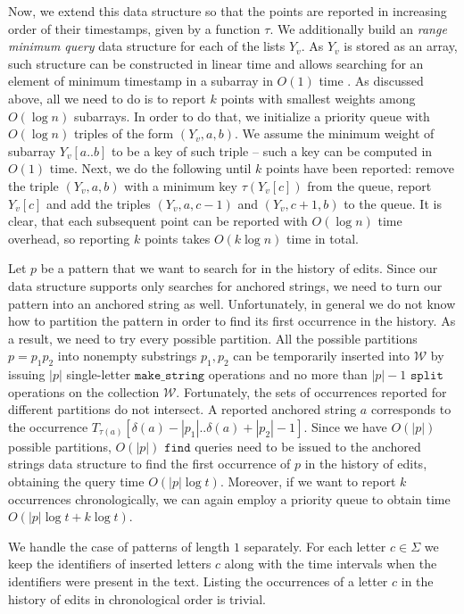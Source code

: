 \documentclass[a4paper]{article}
\theoremstyle{remark}
\newcommand{\makeop}{\mathtt{make\_string}}
\newcommand{\splitop}{\mathtt{split}}
\newcommand{\anchfind}{\mathtt{find}}
\newcommand{\coll}{\mathcal{W}}
\begin{document}
Now, we extend this data structure so that the points are reported
in increasing order of their timestamps, given by a function $\tau$.
We additionally build an \emph{range minimum query} data structure
for each of the lists $Y_v$.
As $Y_v$ is stored as an array,
such structure can be constructed in linear time and allows
searching for an element of minimum timestamp in a subarray in
$O(1)$ time \cite{LCA}.
As discussed above, all we need to do is to report $k$ points
with smallest weights among $O(\log{n})$ subarrays.
In order to do that, we initialize a priority queue with
$O(\log{n})$ triples of the form $(Y_v,a,b)$.
We assume the minimum weight of subarray $Y_v[a..b]$ to be
a key of such triple -- such a key can be computed in $O(1)$ time.
Next, we do the following until $k$ points have been reported:
remove the triple $(Y_v,a,b)$ with a minimum key $\tau(Y_v[c])$ from the queue,
report $Y_v[c]$ and add the triples $(Y_v,a,c-1)$ and $(Y_v,c+1,b)$
to the queue.
It is clear, that each subsequent point can be reported with
$O(\log{n})$ time overhead, so reporting $k$ points takes
$O(k\log{n})$ time in total.

Let $p$ be a pattern that we want to search for in the history
of edits.
Since our data structure supports only searches for anchored strings,
we need to turn our pattern into an anchored string as well.
Unfortunately, in general we do not know how to partition the
pattern in order to find its first occurrence in the history.
As a result, we need to try every possible partition.
All the possible partitions $p=p_1p_2$ into nonempty substrings
$p_1,p_2$ can be temporarily inserted into $\coll$ by
issuing $|p|$ single-letter $\makeop$ operations and no more than $|p|-1$ $\splitop$
operations on the collection $\coll$.
Fortunately, the sets of occurrences reported for different
partitions do not intersect.
A reported anchored string $a$ corresponds to the occurrence
$T_{\tau(a)}[\delta(a)-|p_1|..\delta(a)+|p_2|-1]$.
Since we have $O(|p|)$ possible partitions, $O(|p|)$ $\anchfind$
queries need to be issued to the anchored strings data structure
to find the first occurrence of $p$ in the history of edits,
obtaining the query time $O(|p|\log{t})$.
Moreover, if we want to report $k$ occurrences chronologically,
we can again employ a priority queue to obtain time $O(|p|\log{t}+k\log{t})$.

We handle the case of patterns of length $1$ separately.
For each letter $c\in\Sigma$ we keep the identifiers of
inserted letters $c$ along with the time intervals when
the identifiers were present in the text.
Listing the occurrences of a letter $c$ in the history
of edits in chronological order is trivial.
\end{document}
